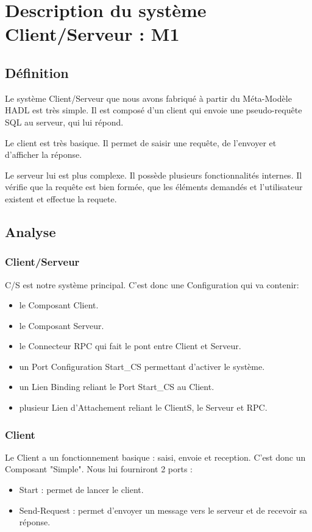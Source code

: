 ﻿\chapter{Description du système Client/Serveur : M1}
	
\section{Définition}
	Le système Client/Serveur que nous avons fabriqué à partir du Méta-Modèle HADL
	est très simple. Il est composé d'un client qui envoie une pseudo-requête SQL
	au serveur, qui lui répond.
	
	Le client est très basique. Il permet de saisir une requête, de l'envoyer et
	d'afficher la réponse.
	
	Le serveur lui est plus complexe. Il possède plusieurs fonctionnalités
	internes. Il vérifie que la requête est bien formée, que les éléments demandés
	et l'utilisateur existent et effectue la
	requete.

\section{Analyse}

	\subsection{Client/Serveur}
		C/S est notre système principal. C'est donc une Configuration qui va contenir: 
		\begin{itemize}
			\item le Composant Client.
			\item le Composant Serveur.
			\item le Connecteur RPC qui fait le pont entre Client et Serveur.
			\item un Port Configuration Start\_CS permettant d'activer le système.
			\item un Lien Binding reliant le Port Start\_CS au Client.
			\item plusieur Lien d'Attachement reliant le ClientS, le Serveur et RPC.
		\end{itemize}
		
	\subsection{Client}
		Le Client a un fonctionnement basique : saisi, envoie et reception. C'est
		donc un Composant "Simple". Nous lui fourniront 2 ports :
		\begin{itemize}
			\item Start : permet de lancer le client.
			\item Send-Request : permet d'envoyer un message vers le serveur et de
			recevoir sa réponse.
		\end{itemize}
		
